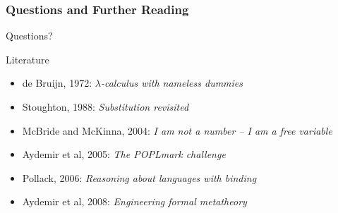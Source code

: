 \documentclass[notheorems]{beamer}
\begin{document}
\begin{frame}

  \frametitle{Questions and Further Reading}

  Questions?\\[4em]

  \begin{block}{Literature}
    \begin{itemize}
      \item de Bruijn, 1972: {\em $\lambda$-calculus with nameless dummies}
      \item Stoughton, 1988: {\em Substitution revisited}
      \item McBride and McKinna, 2004: {\em I am not a number -- I am a free variable}
      \item Aydemir et al, 2005: {\em The POPLmark challenge}
      \item Pollack, 2006: {\em Reasoning about languages with binding}
      \item Aydemir et al, 2008: {\em Engineering formal metatheory}
    \end{itemize}
  \end{block}

\end{frame}
\end{document}
